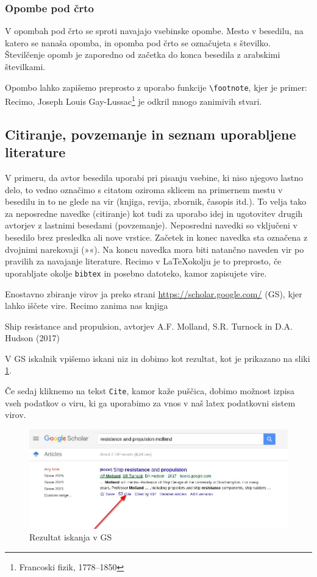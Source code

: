 \documentclass[12pt]{article}
\theoremstyle{definition}
\begin{document}
\subsubsection{Opombe pod črto}

V opombah pod črto se sproti navajajo vsebinske opombe. Mesto v besedilu, na katero se nanaša opomba, in opomba pod črto se označujeta s številko. Številčenje opomb je zaporedno od začetka do konca besedila z arabskimi številkami.

Opombo lahko zapišemo preprosto z uporabo funkcije \texttt{\textbackslash footnote}, kjer je primer: Recimo, Joseph Louis Gay-Lussac\footnote{Francoski fizik, 1778–1850} je odkril mnogo zanimivih stvari.


\subsection{Citiranje, povzemanje in seznam uporabljene literature}

V primeru, da avtor besedila uporabi pri pisanju vsebine, ki niso njegovo lastno delo, to vedno označimo s citatom oziroma sklicem na primernem mestu v besedilu in to ne glede na vir (knjiga, revija, zbornik, časopis itd.). To velja tako za neposredne navedke (citiranje) kot tudi za uporabo idej in ugotovitev drugih avtorjev z lastnimi besedami (povzemanje). 
Neposredni navedki so vključeni v besedilo brez presledka ali nove vrstice. Začetek in konec navedka sta označena z dvojnimi narekovaji (»«). Na koncu navedka mora biti natančno naveden vir po pravilih za navajanje literature. Recimo v \LaTeX okolju je to preprosto, če uporabljate okolje \texttt{bibtex} in posebno datoteko, kamor zapisujete vire.

Enostavno zbiranje virov ja preko strani \url{https://scholar.google.com/} (GS), kjer lahko iščete vire. Recimo zanima nas knjiga

Ship resistance and propulsion, avtorjev A.F. Molland, S.R. Turnock in D.A. Hudson (2017)

V GS iskalnik vpišemo iskani niz in dobimo kot rezultat, kot je prikazano na sliki \ref{fig:gs_cite_01}.

Če sedaj kliknemo na tekst \texttt{Cite}, kamor kaže puščica, dobimo možnost izpisa vseh podatkov o viru, ki ga uporabimo za vnos v naš latex podatkovni sistem virov.

\begin{figure}[h]
	\begin{center}
		\includegraphics[width=0.8\linewidth]{figs/gs_reference_01.jpg}
	\end{center}
	\caption{Rezultat iskanja v GS}
	\label{fig:gs_cite_01}
\end{figure}
\end{document}
